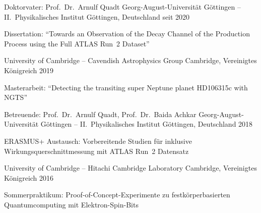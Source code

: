 %
\begin{cventries}%
  \cventry%
    {Doktorvater: Prof.\ Dr.\ Arnulf Quadt} %
    {Georg-August-Universit\"at G\"ottingen -- II.\ Physikalisches Institut} %
    {G\"ottingen, Deutschland} %
    {seit 2020} %
    {%
      \begin{cvitems} %
        \item {%
          Dissertation: ``Towards an Observation of the \Hbb Decay Channel of the \ttH Production Process\newline%
          using the Full ATLAS Run~2 Dataset''%
        }%
      \end{cvitems}%
    }%

    {University of Cambridge -- Cavendish Astrophysics Group} %
    {Cambridge, Vereinigtes K\"onigreich} %
    {2019} %
    {%
      \begin{cvitems} %
        \item {Masterarbeit: ``Detecting the transiting super Neptune planet HD106315c with NGTS''}%
      \end{cvitems}%
    }%

  \cventry%
    {Betreuende: Prof.\ Dr.\ Arnulf Quadt, Prof.\ Dr.\ Baida Achkar} %
    {Georg-August-Universit\"at G\"ottingen -- II.\ Physikalisches Institut} %
    {G\"ottingen, Deutschland} %
    {2018} %
    {%
      \begin{cvitems} %
        \item {ERASMUS+ Austausch: Vorbereitende Studien f\"ur inklusive \ttbar Wirkungsquerschnittmessung mit ATLAS Run~2 Datensatz}%
      \end{cvitems}%
    }%

    {University of Cambridge -- Hitachi Cambridge Laboratory} %
    {Cambridge, Vereinigtes K\"onigreich} %
    {2016} %
    {%
      \begin{cvitems} %
        \item {Sommerpraktikum: Proof-of-Concept-Experimente zu festk\"orperbasierten Quantumcomputing mit Elektron-Spin-Bits}%
      \end{cvitems}%
    }%
\end{cventries}%
